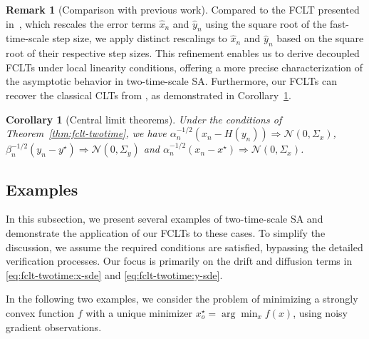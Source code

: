 \documentclass[11pt]{article}
\theoremstyle{plain}
\newtheorem{cor}{Corollary}[section]
\theoremstyle{definition}
\newtheorem{rema}{Remark}[section]
\def\NM{{\mathcal N}}
\newcommand{\xhat}{{\hat{x}}}
\newcommand{\yhat}{{\hat{y}}}
\newcommand{\xx}{{x}}
\newcommand{\yy}{{y}}
\def\weakconverge{\Rightarrow}
\begin{document}
\begin{rema}[Comparison with previous work]
Compared to the FCLT presented in~\cite{faizal2023functional}, which rescales the error terms $\xhat_{n}$ and $\yhat_{n}$ using the square root of the fast-time-scale step size, we apply distinct rescalings to $\xhat_{n}$ and $\yhat_{n}$ based on the square root of their respective step sizes.
This refinement enables us to derive decoupled FCLTs under local linearity conditions, offering a more precise characterization of the asymptotic behavior in two-time-scale SA. Furthermore, our FCLTs can recover the classical CLTs from \cite{konda2004convergence, mokkadem2006convergence}, as demonstrated in Corollary~\ref{cor:clt}.
\end{rema}

\begin{cor}[Central limit theorems]\label{cor:clt}
	Under the conditions of Theorem~\ref{thm:fclt-twotime}, we have 
	$\alpha_{n}^{-1/2} (\xx_{n} - H(\yy_{n})) \weakconverge \NM(0, \Sigma_x)$, 
	$ \beta_{n}^{-1/2} (\yy_{n} - \yy^\star) \weakconverge \NM(0,\Sigma_{y})$ and
	$ \alpha_{n}^{-1/2} (\xx_{n} - \xx^\star) \weakconverge \NM(0, \Sigma_{x})$.
\end{cor}


\subsection{Examples}
\label{sec:fclt:exam}

In this subsection, we present several examples of two-time-scale SA and demonstrate the application of our FCLTs to these cases. To simplify the discussion, we assume the required conditions are satisfied, bypassing the detailed verification processes. Our focus is primarily on the drift and diffusion terms in \eqref{eq:fclt-twotime:x-sde} and \eqref{eq:fclt-twotime:y-sde}.

In the following two examples, we consider the problem of minimizing a strongly convex function $f$ with a unique minimizer $x_o^\star = \arg\min_{x} f(x)$, using noisy gradient observations.
\end{document}
